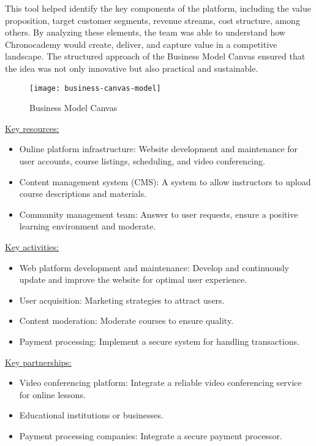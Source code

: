 This tool helped identify the key components of the platform, including the value proposition, target customer segments, revenue streams, cost structure, among others.
By analyzing these elements, the team was able to understand how Chronocademy would create, deliver, and capture value in a competitive landscape.
The structured approach of the Business Model Canvas ensured that the idea was not only innovative but also practical and sustainable.

\begin{figure}[h]
    \centering
    \texttt{[image: business-canvas-model]}
    \caption{Business Model Canvas}
    \label{fig:figure1}
\end{figure}

\underline{Key resources:}
\begin{itemize}
    \item Online platform infrastructure: Website development and maintenance for user accounts, course listings, scheduling, and video conferencing.
    \item Content management system (CMS): A system to allow instructors to upload course descriptions and materials.
    \item Community management team: Answer to user requests, ensure a positive learning environment and moderate.
\end{itemize}

\underline{Key activities:}
\begin{itemize}
    \item Web platform development and maintenance: Develop and continuously update and improve the website for optimal user experience.
    \item User acquisition: Marketing strategies to attract users.
    \item Content moderation: Moderate courses to ensure quality.
    \item Payment processing: Implement a secure system for handling transactions.
\end{itemize}

\underline{Key partnerships:}
\begin{itemize}
    \item Video conferencing platform: Integrate a reliable video conferencing service for online lessons.
    \item Educational institutions or businesses.
    \item Payment processing companies: Integrate a secure payment processor.
\end{itemize}

